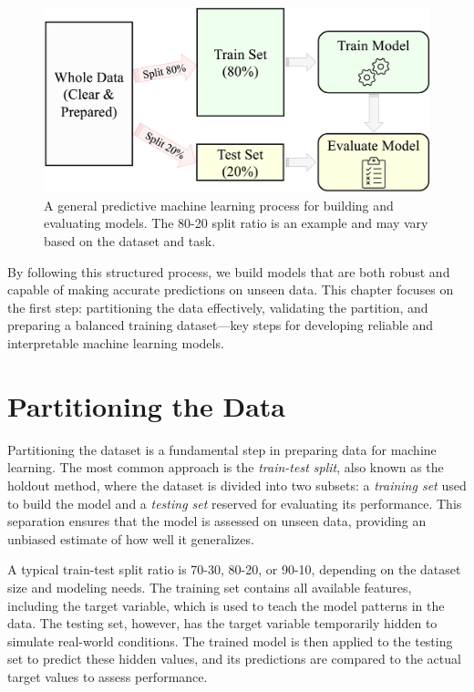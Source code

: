 \documentclass[
]{book}
\theoremstyle{definition}
\theoremstyle{definition}
\theoremstyle{definition}
\theoremstyle{definition}
\theoremstyle{remark}
\begin{document}
\begin{figure}

{\centering \includegraphics[width=0.8\linewidth]{images/ch6_partitioning} 

}

\caption{A general predictive machine learning process for building and evaluating models. The 80-20 split ratio is an example and may vary based on the dataset and task.}\label{fig:modeling}
\end{figure}

By following this structured process, we build models that are both robust and capable of making accurate predictions on unseen data. This chapter focuses on the first step: partitioning the data effectively, validating the partition, and preparing a balanced training dataset---key steps for developing reliable and interpretable machine learning models.

\section{Partitioning the Data}\label{sec-partitioning}

Partitioning the dataset is a fundamental step in preparing data for machine learning. The most common approach is the \emph{train-test split}, also known as the holdout method, where the dataset is divided into two subsets: a \emph{training set} used to build the model and a \emph{testing set} reserved for evaluating its performance. This separation ensures that the model is assessed on unseen data, providing an unbiased estimate of how well it generalizes.

A typical train-test split ratio is 70-30, 80-20, or 90-10, depending on the dataset size and modeling needs. The training set contains all available features, including the target variable, which is used to teach the model patterns in the data. The testing set, however, has the target variable temporarily hidden to simulate real-world conditions. The trained model is then applied to the testing set to predict these hidden values, and its predictions are compared to the actual target values to assess performance.
\end{document}

